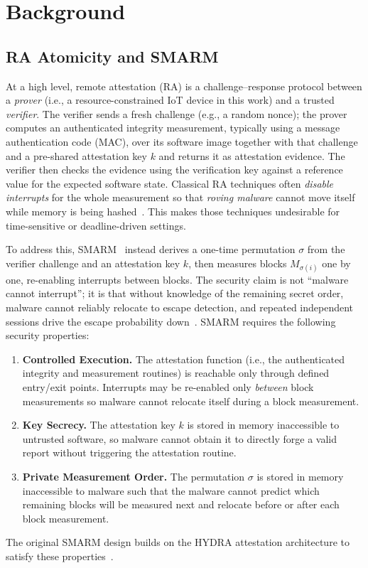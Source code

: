\documentclass[conference]{IEEEtran}
\newcommand\oak[1]{\textcolor{red}{OAK: #1}}
\begin{document}
\section{Background}
\label{sec:background}

\subsection{RA Atomicity and SMARM}

At a high level, remote attestation (RA) is a challenge--response
protocol between a \emph{prover} (i.e., a resource-constrained IoT device in this work) and a trusted \emph{verifier}.
The verifier sends a fresh challenge (e.g., a random nonce); 
the prover computes an authenticated integrity measurement, typically using a message authentication code (MAC), over its software image together with that challenge and a pre-shared attestation key $k$ and returns it as attestation evidence. 
The verifier then checks the evidence using the verification key against a reference value for the expected software state.
Classical RA techniques often \emph{disable interrupts} for the whole measurement so that \emph{roving malware} cannot move itself while memory is being hashed~\cite{eldefrawy2012smart,nunes2019vrased}.
This makes those techniques undesirable for time-sensitive or deadline-driven settings.

To address this, SMARM~\cite{carpent2018smarm} instead derives a one-time permutation $\sigma$ from the verifier challenge and an attestation key $k$, then measures blocks $M_{\sigma(i)}$ one by one, re-enabling interrupts between blocks.
The security claim is not ``malware cannot interrupt''; it is that without knowledge of the remaining secret order, malware cannot reliably relocate to escape detection, and repeated independent sessions drive the escape probability down~\cite{carpent2018smarm}.
SMARM requires the following security properties:
\begin{enumerate}
  \item[\textbf{[S1]}] \textbf{Controlled Execution.}
    The attestation function (i.e., the authenticated integrity and measurement routines) is reachable only through defined
    entry/exit points. Interrupts may be re-enabled only
    \emph{between} block measurements so malware cannot relocate itself during a block measurement.
  \item[\textbf{[S2]}] \textbf{Key Secrecy.}
    The attestation key $k$ is stored in memory inaccessible to
    untrusted software, so malware cannot obtain it to directly forge a valid report without triggering the attestation routine.
  \item[\textbf{[S3]}] \textbf{Private Measurement Order.}
    The permutation $\sigma$ is stored in memory inaccessible to malware such that the malware cannot predict which remaining blocks will be measured next and relocate before or after each block measurement.
\end{enumerate}
The original SMARM design builds on the HYDRA attestation architecture to satisfy these properties~\cite{eldefrawy2017hydra}.
\end{document}
